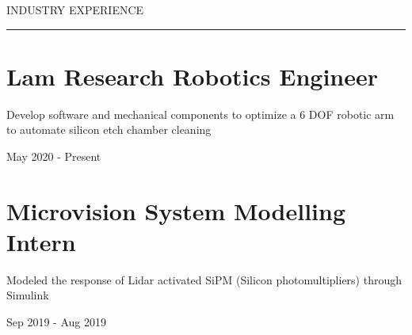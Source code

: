 \documentclass[letterpaper,10pt,oneside]{article}
\begin{document}
\begin{body}
\vspace{1ex}



{
\hspace{-1.72in}\noindent\color{cblue}
{INDUSTRY EXPERIENCE} %
}

\vspace{-1.6ex}
{\hspace{-1.73in}\noindent\color{dblue}\rule{6.935in}{0.4pt}} %
\vspace{-5ex}


\section
{\textbf{Lam Research}
\newline
Robotics Engineer
\newline}


\vspace{-2.5ex}
\begin{detail}
\BulletItem
Develop software and mechanical components to optimize a 6 DOF robotic arm 
\newline
to automate silicon etch chamber cleaning
\end{detail}

\begin{subtitle}
\vspace{-7.8ex}
{{May 2020 - Present}} 
\end{subtitle}


\section
{\textbf{Microvision}
\newline
System Modelling Intern 
\newline}


\vspace{-2.5ex}
\begin{detail}
\BulletItem
Modeled the response of Lidar activated SiPM (Silicon photomultipliers) 
\newline
through Simulink
\end{detail}

\begin{subtitle}
\vspace{-7.8ex}
{{Sep 2019 - Aug 2019}} 
\end{subtitle}



\end{body}
\end{document}
